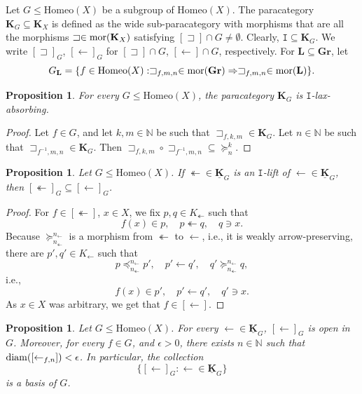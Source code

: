 \documentclass[12pt]{amsart}
\numberwithin{equation}{section}
\theoremstyle{plain}
\newtheorem{proposition}[theorem]{\bf Proposition}
\theoremstyle{definition}
\newcommand \Homeo{ \mbox{Homeo}}
\newcommand \sqsp{\sqsupset}
\newcommand \la{\leftarrow}
\newcommand \mor{{\rm{mor}}}
\newcommand \diam{{\rm{ diam}}}
\newcommand \GGRb{\mathbf{Gr}}
\newcommand \KKb{\mathbf{K}}
\newcommand \LLb{\mathbf{L}}
\newcommand \KKub{\underline{\mathbf{K}}}
\newcommand \NN{\mathbb{N}}
\newcommand \It{\mathtt{I}}
\begin{document}
Let $G \leq \Homeo(X)$ be a subgroup of $\Homeo(X)$. The paracategory $\KKb_G \subseteq \KKb_X$ is defined as the wide sub-paracategory with morphisms that are all the morphisms $\sqsp \in \mor(\KKb_X)$ satisfying $[\sqsp] \cap G \neq \emptyset$. Clearly, $\It \subseteq \KKb_G$. We write $[\sqsp]_G$, $[\la]_G$ for $[\sqsp] \cap G$, $[\la] \cap G$, respectively. For $\LLb \subseteq \GGRb$, let 
%
\[ G_\LLb=\{f \in \Homeo(X):  \sqsp_{f,m,n} \in \mor(\GGRb) \Rightarrow \sqsp_{f,m,n} \in \mor(\LLb)\}. \]
%


\begin{proposition}
\label{pr:LaxAbs}
For every $G \leq \Homeo(X)$, the paracategory $\KKb_G$ is  $\It$-lax-absorbing.
\end{proposition}

\begin{proof}
Let $f \in G$, and let $k,m \in \NN$ be such that $\sqsp_{f,k,m} \in \KKb_G$.  Let $n \in \NN$ be such that $\sqsp_{f^{-1},m,n} \in \KKb_G$. Then $\sqsp_{f,k,m} \circ \sqsp_{f^{-1},m,n} \subseteq \succeq^k_n$.
\end{proof}

\begin{proposition}
\label{pr:Subset}
Let $G \leq \Homeo(X)$. If $\twoheadleftarrow \in \KKub_G$ is an $\It$-lift of $\la \in \KKub_G$, then $[\twoheadleftarrow]_G \subseteq [\la]_G$.
\end{proposition}

\begin{proof}
For $f \in [\twoheadleftarrow]$, $x \in X$, we fix $p,q \in K_\twoheadleftarrow$ such that $$f(x) \in p, \quad p \twoheadleftarrow q, \quad q \ni x.$$ Because $\succeq^{n_\la}_{n_\twoheadleftarrow}$ is a morphism from $\twoheadleftarrow$ to $\la$, i.e., it is weakly arrow-preserving, there are $p', q' \in K_\la$ such that $$ p \preceq^{n_\la}_{n_\twoheadleftarrow} p', \quad p' \la q', \quad q' \succeq^{n_\la}_{n_\twoheadleftarrow} q,$$ i.e., $$f(x) \in p', \quad p' \la q', \quad q' \ni x.$$ As $x \in X$ was arbitrary, we get that $f \in [\la]$.
\end{proof}

\begin{proposition}
\label{pr:Basis}
Let $G \leq \Homeo(X)$. For every $\la \in \KKub_G$, $[\la]_G$ is open in $G$. Moreover, for every $f \in G$, and $\epsilon>0$, there exists $n \in \NN$ such that $\diam([\la_{f,n}])<\epsilon$.  In particular,  the collection $$\{[\la]_G: \la \in \KKub_G\}$$ is a basis of $G$. 
\end{proposition}
\end{document}
